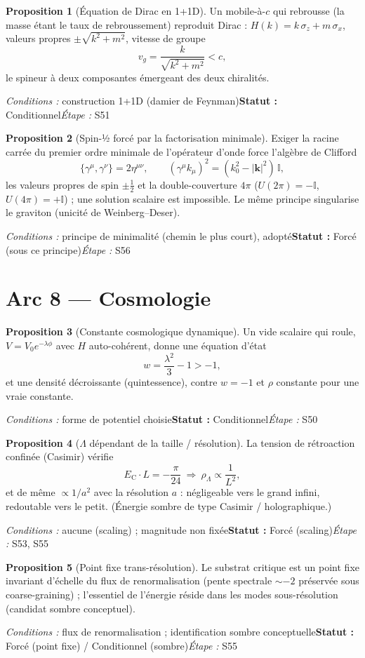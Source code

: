 \documentclass[11pt,a4paper]{article}
\theoremstyle{definition}
\newtheorem{prop}{Proposition}
\newcommand{\statut}[3]{\par\smallskip\noindent\textit{Conditions :} #1\quad\textbf{Statut :} #2\quad\textit{Étape :} #3\par\medskip}
\begin{document}
\begin{prop}[Équation de Dirac en 1+1D]
Un mobile-à-$c$ qui rebrousse (la masse étant le taux de rebroussement) reproduit Dirac : $H(k)=k\,\sigma_z+m\,\sigma_x$, valeurs propres $\pm\sqrt{k^2+m^2}$, vitesse de groupe
\[ v_g=\frac{k}{\sqrt{k^2+m^2}}<c, \]
le spineur à deux composantes émergeant des deux chiralités.
\end{prop}
\statut{construction 1+1D (damier de Feynman)}{Conditionnel}{S51}

\begin{prop}[Spin-½ forcé par la factorisation minimale]
Exiger la racine carrée du premier ordre minimale de l'opérateur d'onde force l'algèbre de Clifford
\[ \{\gamma^\mu,\gamma^\nu\}=2\eta^{\mu\nu},\qquad (\gamma^\mu k_\mu)^2=(k_0^2-|\mathbf k|^2)\,\mathbb{I}, \]
les valeurs propres de spin $\pm\tfrac12$ et la double-couverture $4\pi$ ($U(2\pi)=-\mathbb{I}$, $U(4\pi)=+\mathbb{I}$) ; une solution scalaire est impossible. Le même principe singularise le graviton (unicité de Weinberg--Deser).
\end{prop}
\statut{principe de minimalité (chemin le plus court), adopté}{Forcé (sous ce principe)}{S56}

\section*{Arc 8 — Cosmologie}

\begin{prop}[Constante cosmologique dynamique]
Un vide scalaire qui roule, $V=V_0e^{-\lambda\phi}$ avec $H$ auto-cohérent, donne une équation d'état
\[ w=\frac{\lambda^2}{3}-1>-1, \]
et une densité décroissante (quintessence), contre $w=-1$ et $\rho$ constante pour une vraie constante.
\end{prop}
\statut{forme de potentiel choisie}{Conditionnel}{S50}

\begin{prop}[$\Lambda$ dépendant de la taille / résolution]
La tension de rétroaction confinée (Casimir) vérifie
\[ E_{\mathrm{C}}\cdot L=-\frac{\pi}{24}\ \Rightarrow\ \rho_\Lambda\propto \frac{1}{L^2}, \]
et de même $\propto 1/a^2$ avec la résolution $a$ : négligeable vers le grand infini, redoutable vers le petit. (Énergie sombre de type Casimir / holographique.)
\end{prop}
\statut{aucune (scaling) ; magnitude non fixée}{Forcé (scaling)}{S53, S55}

\begin{prop}[Point fixe trans-résolution]
Le substrat critique est un point fixe invariant d'échelle du flux de renormalisation (pente spectrale $\sim-2$ préservée sous coarse-graining) ; l'essentiel de l'énergie réside dans les modes sous-résolution (candidat sombre conceptuel).
\end{prop}
\statut{flux de renormalisation ; identification sombre conceptuelle}{Forcé (point fixe) / Conditionnel (sombre)}{S55}
\end{document}
